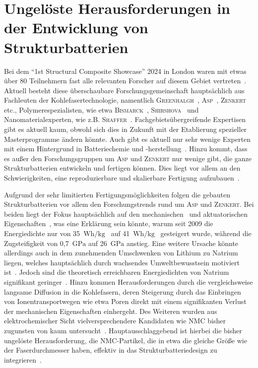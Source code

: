 \section{Ungelöste Herausforderungen in der Entwicklung von Strukturbatterien}
Bei dem "`1st Structural Composite Showcase"' 2024 in London waren mit etwas über 80 Teilnehmern fast alle relevanten Forscher auf diesem Gebiet vertreten~\cite{Greenhalgh2024}. Aktuell besteht diese überschaubare Forschungsgemeinschaft hauptsächlich aus Fachleuten der Kohlefasertechnologie, namentlich \textsc{Greenhalgh}~\cite{Greenhalgh2023}, \textsc{Asp}~\cite{Asp2019,Asp2021}, \textsc{Zenkert}~\cite{Zenkert2024} etc., Polymerespezialisten, wie etwa \textsc{Bismarck}~\cite{Bismarck2012}, \textsc{Shirshova}~\cite{Shirshova2013} und Nanomaterialexperten, wie z.B. \textsc{Shaffer}~\cite{Senokos2023}. Fachgebietsübergreifende Expertisen gibt es aktuell kaum, obwohl sich dies in Zukunft mit der Etablierung spezieller Masterprogramme ändern könnte. Auch gibt es aktuell nur sehr wenige Experten mit einem Hintergrund in Batteriechemie und -herstellung~\cite{Asp2013US}. Hinzu kommt, dass es außer den Forschungsgruppen um \textsc{Asp} und \textsc{Zenkert} nur wenige gibt, die ganze Strukturbatterien entwickeln und fertigen können. Dies liegt vor allem an den Schwierigkeiten, eine reproduzierbare und skalierbare Fertigung aufzubauen~\cite{Siraj2023}.

Aufgrund der sehr limitierten Fertigungsmöglichkeiten folgen die gebauten Strukturbatterien vor allem den Forschungstrends rund um \textsc{Asp} und \textsc{Zenkert}. Bei beiden liegt der Fokus hauptsächlich auf den mechanischen~\cite{Carlstedt2019a,Asp2021,Duan2021} und aktuatorischen Eigenschaften~\cite{Carlstedt2023}, was eine Erklärung sein könnte, warum seit 2009 die Energiedichte nur von 35~$\si{\watt \hour \per \kg}$~\cite{Liu2009} auf 41~$\si{\watt \hour \per \kg}$~\cite{Siraj2023} gesteigert wurde, während die Zugsteifigkeit von 0,7~$\si{\GPa}$ auf 26~$\si{\GPa}$ anstieg. Eine weitere Ursache könnte allerdings auch in dem zunehmenden Umschwenken von Lithium zu Natrium liegen, welches hauptsächlich durch wachsendes Umweltbewusstsein motiviert ist~\cite{Peters2022}. Jedoch sind die theoretisch erreichbaren Energiedichten von Natrium signifikant geringer~\cite{Kundu2015}. Hinzu kommen Herausforderungen durch die vergleichsweise langsame Diffusion in die Kohlefasern, deren Steigerung durch das Einbringen von Ionentransportwegen wie etwa Poren direkt mit einem signifikanten Verlust der mechanischen Eigenschaften einhergeht. Des Weiteren wurden aus elektrochemischer Sicht vielversprechendere Kandidaten wie NMC bisher zugunsten von  kaum untersucht~\cite{Asp2024}. Hauptausschlaggebend ist hierbei die bisher ungelöste Herausforderung, die NMC-Partikel, die in etwa die gleiche Größe wie der Faserdurchmesser haben, effektiv in das Strukturbatteriedesign zu integrieren~\cite{Asp2014}.

